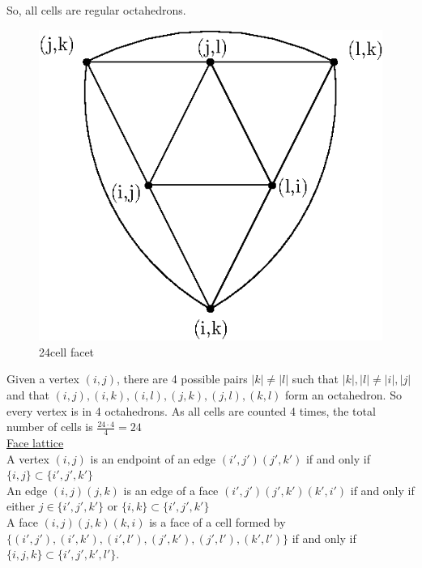 \documentclass[paper=a4, fontsize=11pt]{scrartcl} %
\theoremstyle{plain}
\begin{document}
So, all cells are regular octahedrons.

\begin{figure}[!htb]
\centering
\includegraphics[scale=0.8]{figures/facet.eps}
\caption{24cell facet}
\label{fig:face}
\end{figure}

Given a vertex $(i,j)$, there are 4 possible pairs $\vert k \vert \neq \vert l \vert$ such that $\vert k \vert, \vert l \vert \neq \vert i \vert, \vert j \vert$ and that $(i,j),(i,k),(i,l),(j,k),(j,l),(k,l)$ form an octahedron. So every vertex is in 4 octahedrons. As all cells are counted 4 times, the total number of cells is $\frac{24 \cdot 4}{4} = 24$ \\

\underline{Face lattice} \\

A vertex $(i,j)$ is an endpoint of an edge $(i',j')(j',k')$ if and only if $\{i,j\} \subset \{i',j',k'\}$ \\

An edge $(i,j)(j,k)$ is an edge of a face $(i',j')(j',k')(k',i')$ if and only if either $j \in \{i',j',k'\}$ or $\{i,k\} \subset \{i',j',k'\}$ \\

A face $(i,j)(j,k)(k,i)$ is a face of a cell formed by $\{(i',j'),(i',k'),(i',l'),(j',k'),(j',l'),(k',l')\}$ if and only if $\{i,j,k\} \subset \{i',j',k',l'\}$.\\
\end{document}
